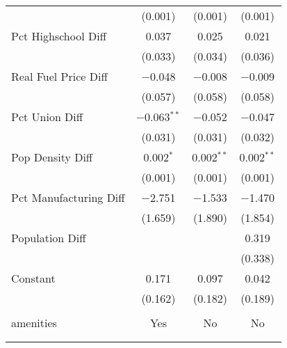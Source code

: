 \begin{table}[!htbp]
\begin{tabular}{@{\extracolsep{5pt}}lccc}
  & (0.001) & (0.001) & (0.001) \\ 
  Pct Highschool Diff & 0.037 & 0.025 & 0.021 \\ 
  & (0.033) & (0.034) & (0.036) \\ 
  Real Fuel Price Diff & $-$0.048 & $-$0.008 & $-$0.009 \\ 
  & (0.057) & (0.058) & (0.058) \\ 
  Pct Union Diff & $-$0.063$^{**}$ & $-$0.052 & $-$0.047 \\ 
  & (0.031) & (0.031) & (0.032) \\ 
  Pop Density Diff & 0.002$^{*}$ & 0.002$^{**}$ & 0.002$^{**}$ \\ 
  & (0.001) & (0.001) & (0.001) \\ 
  Pct Manufacturing Diff & $-$2.751 & $-$1.533 & $-$1.470 \\ 
  & (1.659) & (1.890) & (1.854) \\ 
  Population Diff &  &  & 0.319 \\ 
  &  &  & (0.338) \\ 
  Constant & 0.171 & 0.097 & 0.042 \\ 
  & (0.162) & (0.182) & (0.189) \\ 
 \hline \\[-1.8ex] 
amenities & Yes & No & No \\ 
\hline \\[-1.8ex] 
\hline 
\hline \\[-1.8ex] 
\end{tabular} 
\end{table} 
